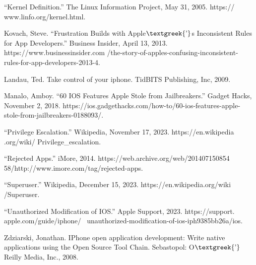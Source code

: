 \documentclass{article}
\begin{document}
“Kernel Definition.” The Linux Information Project, May 31, 2005. https:// www.linfo.org/kernel.html.

Kovach, Steve. “Frustration Builds with Apple$\text{\textgreek{’}}$s Inconsistent Rules for App Developers.” Business
Insider, April 13, 2013. https://www.businessinsider.com
/the-story-of-apples-confusing-inconsistent-rules-for-app-developers-2013-4.

Landau, Ted. Take control of your iphone. TidBITS Publishing, Inc, 2009.

Manalo, Amboy. “60 IOS Features Apple Stole from Jailbreakers.” Gadget Hacks, November 2, 2018.
https://ios.gadgethacks.com/how-to/60-ios-features-apple-stole-from-jailbreakers-0188093/.

“Privilege Escalation.” Wikipedia, November 17, 2023. https://en.wikipedia .org/wiki/ Privilege\_escalation.

“Rejected Apps.” iMore, 2014. https://web.archive.org/web/201407150854 58/http://www.imore.com/tag/rejected-apps.

“Superuser.” Wikipedia, December 15, 2023. https://en.wikipedia.org/wiki /Superuser.

“Unauthorized Modification of IOS.” Apple Support, 2023. https://support. apple.com/guide/iphone/
\ unauthorized-modification-of-ios-iph9385bb26a/ios.

Zdziarski, Jonathan. IPhone open application development: Write native applications using the Open Source Tool Chain.
Sebastopol: O$\text{\textgreek{’}}$Reilly Media, Inc., 2008.
\end{document}
